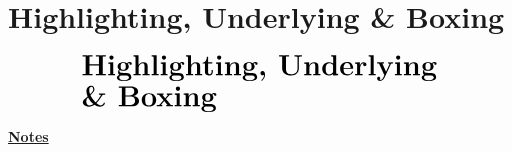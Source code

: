\documentclass[10pt]{beamer}
\begin{document}
\section{Highlighting, Underlying \& Boxing}
\begin{frame}
    \begin{eqnarray*}
        &\text{{\huge \textbf{Highlighting, Underlying}}}\\
        &\text{{\huge \textbf{\& Boxing}}}\\
    \end{eqnarray*}
\end{frame}
\begin{flushleft}
    \underline{\textbf{Notes}}\setlength{\parskip}{.15cm}\notesize\newline\par
\end{flushleft}
\end{document}
